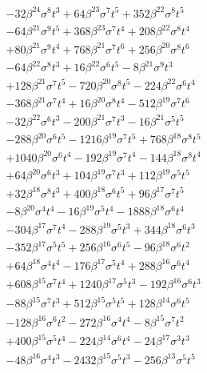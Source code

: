 {\begin{align*}
&-32\beta^{24} \sigma^{8} t^{3}+64\beta^{23} \sigma^{7} t^{5}+352\beta^{22} \sigma^{8} t^{5}\\
&-64\beta^{21} \sigma^{9} t^{5}+368\beta^{23} \sigma^{7} t^{4}+208\beta^{22} \sigma^{8} t^{4}\\
&+80\beta^{21} \sigma^{9} t^{4}+768\beta^{21} \sigma^{7} t^{6}+256\beta^{20} \sigma^{8} t^{6}\\
&-64\beta^{22} \sigma^{8} t^{3}+16\beta^{22} \sigma^{6} t^{5}-8\beta^{21} \sigma^{9} t^{3}\\
&+128\beta^{21} \sigma^{7} t^{5}-720\beta^{20} \sigma^{8} t^{5}-224\beta^{22} \sigma^{6} t^{4}\\
&-368\beta^{21} \sigma^{7} t^{4}+16\beta^{20} \sigma^{8} t^{4}-512\beta^{19} \sigma^{7} t^{6}\\
&-32\beta^{22} \sigma^{6} t^{3}-200\beta^{21} \sigma^{7} t^{3}-16\beta^{21} \sigma^{5} t^{5}\\
&-288\beta^{20} \sigma^{6} t^{5}-1216\beta^{19} \sigma^{7} t^{5}+768\beta^{18} \sigma^{8} t^{5}\\
&+1040\beta^{20} \sigma^{6} t^{4}-192\beta^{19} \sigma^{7} t^{4}-144\beta^{18} \sigma^{8} t^{4}\\
&+64\beta^{20} \sigma^{6} t^{3}+104\beta^{19} \sigma^{7} t^{3}+112\beta^{19} \sigma^{5} t^{5}\\
&+32\beta^{18} \sigma^{8} t^{3}+400\beta^{18} \sigma^{6} t^{5}+96\beta^{17} \sigma^{7} t^{5}\\
&-8\beta^{20} \sigma^{4} t^{4}-16\beta^{19} \sigma^{5} t^{4}-1888\beta^{18} \sigma^{6} t^{4}\\
&-304\beta^{17} \sigma^{7} t^{4}-288\beta^{19} \sigma^{5} t^{3}+344\beta^{18} \sigma^{6} t^{3}\\
&-352\beta^{17} \sigma^{5} t^{5}+256\beta^{16} \sigma^{6} t^{5}-96\beta^{18} \sigma^{6} t^{2}\\
&+64\beta^{18} \sigma^{4} t^{4}-176\beta^{17} \sigma^{5} t^{4}+288\beta^{16} \sigma^{6} t^{4}\\
&+608\beta^{15} \sigma^{7} t^{4}+1240\beta^{17} \sigma^{5} t^{3}-192\beta^{16} \sigma^{6} t^{3}\\
&-88\beta^{15} \sigma^{7} t^{3}+512\beta^{15} \sigma^{5} t^{5}+128\beta^{14} \sigma^{6} t^{5}\\
&-128\beta^{16} \sigma^{6} t^{2}-272\beta^{16} \sigma^{4} t^{4}-8\beta^{15} \sigma^{7} t^{2}\\
&+400\beta^{15} \sigma^{5} t^{4}-224\beta^{14} \sigma^{6} t^{4}-24\beta^{17} \sigma^{3} t^{3}\\
&-48\beta^{16} \sigma^{4} t^{3}-2432\beta^{15} \sigma^{5} t^{3}-256\beta^{13} \sigma^{5} t^{5}\\

\end{align*}}
